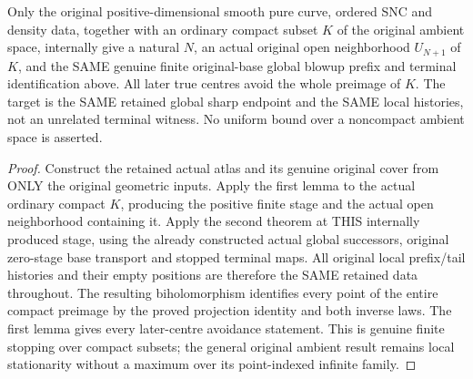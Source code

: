 \begin{theorem}
\label{hir:sharp-actual-curve-original-compact-subset-finite-stopping}
\leanok
Only the original positive-dimensional smooth pure curve, ordered SNC and
density data, together with an ordinary compact subset $K$ of the original
ambient space, internally give a natural $N$, an actual original open
neighborhood $U_{N+1}$ of $K$, and the SAME genuine finite original-base
global blowup prefix and terminal identification above. All later true
centres avoid the whole preimage of $K$. The target is the SAME retained
global sharp endpoint and the SAME local histories, not an unrelated
terminal witness. No uniform bound over a noncompact ambient space is
asserted.
\end{theorem}
\begin{proof}
Construct the retained actual atlas and its genuine original cover from
ONLY the original geometric inputs. Apply the first lemma to the actual
ordinary compact $K$, producing the positive finite stage and the actual
open neighborhood containing it. Apply the second theorem at THIS
internally produced stage, using the already constructed actual global
successors, original zero-stage base transport and stopped terminal maps.
All original local prefix/tail histories and their empty positions are
therefore the SAME retained data throughout. The resulting biholomorphism
identifies every point of the entire compact preimage by the proved
projection identity and both inverse laws. The first lemma gives every
later-centre avoidance statement. This is genuine finite stopping over
compact subsets; the general original ambient result remains local
stationarity without a maximum over its point-indexed infinite family.
\end{proof}

